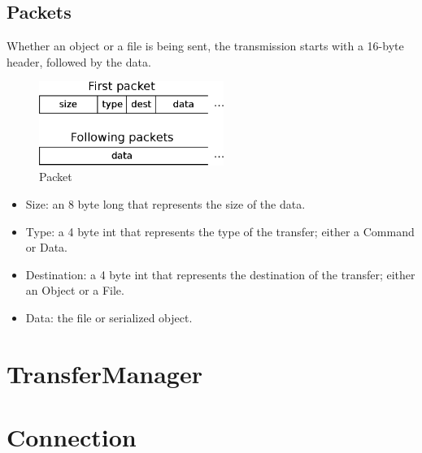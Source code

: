 \documentclass[11pt]{article}
\begin{document}
\subsection{Packets}
	Whether an object or a file is being sent, the transmission starts with a 16-byte header, followed by the data.
	\begin{figure}[H]
	\centering
	\includegraphics[width=60mm]{img/drawing4.eps}
	\caption[Packet]{Packet}
	\label{drawing4}
	\end{figure}
	\begin{itemize}
		\item Size: an 8 byte long that represents the size of the data.
		\item Type: a 4 byte int that represents the type of the transfer; either a Command or Data.
		\item Destination: a 4 byte int that represents the destination of the transfer; either an Object or a File.
		\item Data: the file or serialized object.
	\end{itemize}

\section{TransferManager}

\section{Connection}
\end{document}
